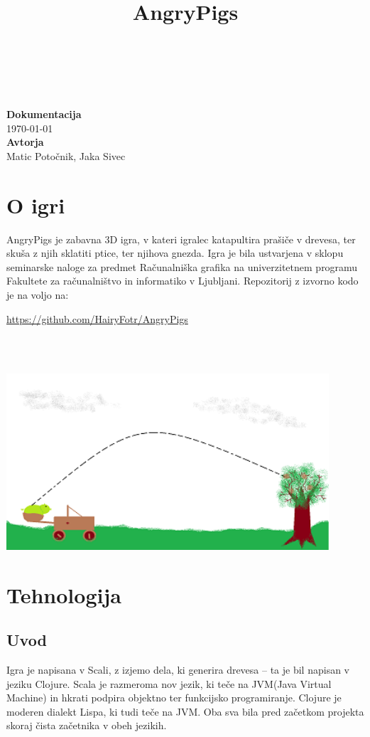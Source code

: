 \documentclass[10pt,a4paper,oneside]{book}
\title{AngryPigs}
\newcommand\inline[1]{%
\begin{Sbox}{#1}\end{Sbox}%
\colorbox{lightgray}{\TheSbox}%
}
\newcommand\br{%
 \ \\ \ \\%
}
\begin{document}
\begin{titlepage}
\begin{center}
\ \\[3.5cm]
{}\\[-2.8cm]
{}\\[3.9cm]
{\Huge\bf Dokumentacija}\\[0.35cm]
{\huge\today}\ \\[4.5cm]
{\Huge {\bf Avtorja}}\\[0.35cm]
{\huge Matic Potočnik, Jaka Sivec}
\vfill
\end{center}
\end{titlepage}
\chapter{O igri}
AngryPigs je zabavna 3D igra, v kateri igralec katapultira prašiče v drevesa, ter skuša z njih sklatiti ptice, ter njihova gnezda. Igra je bila ustvarjena v sklopu seminarske naloge za predmet Računalniška grafika na univerzitetnem programu Fakultete za računalništvo in informatiko v Ljubljani. Repozitorij z izvorno kodo je na voljo na: \inline{\url{https://github.com/HairyFotr/AngryPigs}}
\br
\begin{center}
\includegraphics[width=12cm]{conceptsmall}
\end{center}

\chapter{Tehnologija}
\section{Uvod}
Igra je napisana v Scali, z izjemo dela, ki generira drevesa -- ta je bil napisan v jeziku Clojure. Scala je razmeroma nov jezik, ki teče na JVM(Java Virtual Machine) in hkrati podpira objektno ter funkcijsko programiranje. Clojure je moderen dialekt Lispa, ki tudi teče na JVM. Oba sva bila pred začetkom projekta skoraj čista začetnika v obeh jezikih.\\[-7pt]
\end{document}
